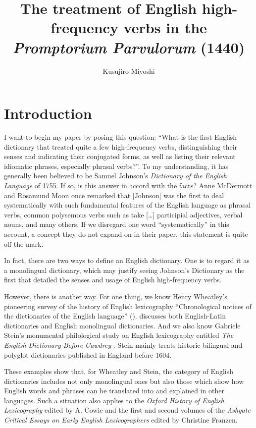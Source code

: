 \documentclass[output=paper,colorlinks,citecolor=brown,arabicfont,chinesefont]{langscibook}
\author{Kusujiro Miyoshi\affiliation{Soka Women's College in Tokyo, Japan}}
\title[English high-frequency verbs in the \textit{Promptorium Parvulorum}]
      {The treatment of English high-frequency verbs in the \textit{Promptorium Parvulorum} (1440)}
\begin{document}
 
\maketitle

\section{Introduction}

I want to begin my paper by posing this question: “What is the first English dictionary that treated quite a few high-frequency verbs, distinguishing their senses and indicating their conjugated forms, as well as listing their relevant idiomatic phrases, especially phrasal verbs?”. To my understanding, it has generally been believed to be Samuel Johnson’s \textit{Dictionary of the 
English Language} of 1755. If so, is this answer in accord with the facts? Anne McDermott and Rosamund Moon once remarked that [Johnson] was the first to deal systematically with such fundamental features of the English language as phrasal verbs, common polysemous verbs such as take […] participial adjectives, verbal nouns, and many others. \citep[153]{McDermottMoon2005} If we disregard one word “systematically” in this account, a concept they do not expand on in their paper, this statement is quite off the mark.

In fact, there are two ways to define an English dictionary. One is to regard it as a monolingual dictionary, which may justify seeing Johnson’s Dictionary as the first that detailed the senses and usage of English high-frequency verbs.

However, there is another way. For one thing, we know Henry Wheatley’s pioneering survey of the history of English lexicography “Chronological notices of the dictionaries of the English language” (\citet{Wheatley1865}). discusses both English-Latin dictionaries and English monolingual dictionaries. And we also know Gabriele Stein’s monumental philological study on English lexicography entitled \textit{The English Dictionary Before Cawdrey} \citep{Stein1985}. Stein mainly treats historic bilingual and polyglot dictionaries published in England before 1604.

These examples show that, for Wheatley and Stein, the category of English dictionaries includes not only monolingual ones but also those which show how English words and phrases can be translated into and explained in other languages. Such a situation also applies to the \textit{Oxford History of English Lexicography} \citep{Cowie2009} edited by A. Cowie and the first and second volumes of the \textit{Ashgate Critical Essays on Early English Lexicographers} \citep{Franzen2012} edited by Christine Franzen.
\end{document}
